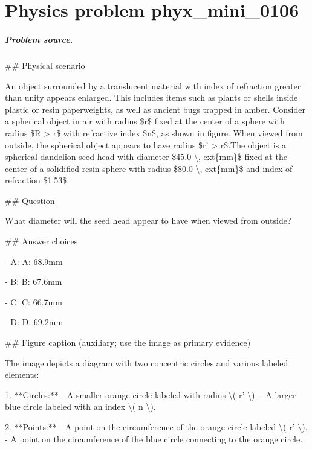 
\chapter{Physics problem phyx\_mini\_0106}
\label{ch:PhyXMiniProblems_problem_phyx_mini_0106}

\paragraph{Problem source.}
\#\# Physical scenario

An object surrounded by a translucent material with index of refraction greater than unity appears enlarged. This includes items such as plants or shells inside plastic or resin paperweights, as well as ancient bugs trapped in amber. Consider a spherical object in air with radius \$r\$ fixed at the center of a sphere with radius \$R > r\$ with refractive index \$n\$, as shown in figure. When viewed from outside, the spherical object appears to have radius \$r' > r\$.The object is a spherical dandelion seed head with diameter \$45.0 \textbackslash{}, 	ext\{mm\}\$ fixed at the center of a solidified resin sphere with radius \$80.0 \textbackslash{}, 	ext\{mm\}\$ and index of refraction \$1.53\$.

\#\# Question

What diameter will the seed head appear to have when viewed from outside?

\#\# Answer choices

- A: A: 68.9mm

- B: B: 67.6mm

- C: C: 66.7mm

- D: D: 69.2mm

\#\# Figure caption (auxiliary; use the image as primary evidence)

The image depicts a diagram with two concentric circles and various labeled elements:

1. **Circles:**
   - A smaller orange circle labeled with radius \textbackslash{}( r' \textbackslash{}).
   - A larger blue circle labeled with an index \textbackslash{}( n \textbackslash{}).

2. **Points:**
   - A point on the circumference of the orange circle labeled \textbackslash{}( r' \textbackslash{}).
   - A point on the circumference of the blue circle connecting to the orange circle.

